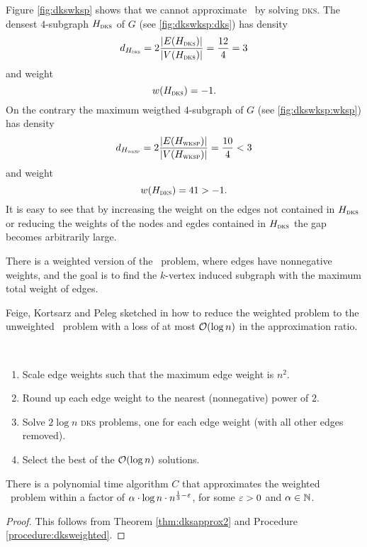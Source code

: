 \begin{example}
	Figure \ref{fig:dkswksp} shows that we cannot approximate \maxWIkSP\ by solving \textsc{dks}. The densest $4$-subgraph $H_{\textsc{dks}}$ of $G$ (see \ref{fig:dkswksp:dks}) has density 
	$$d_{H_{\textsc{dks}}} = 2 \frac{|E(H_{\textsc{dks}})|}{|V(H_{\textsc{dks}})|} = \frac{12}{4} = 3$$
	and weight
	$$w(H_{\textsc{dks}}) = -1.$$
	On the contrary the maximum weigthed $4$-subgraph of $G$ (see \ref{fig:dkswksp:wksp}) has density
	$$d_{H_{\textsc{wksp}}} = 2 \frac{|E(H_{\textsc{wksp}})|}{|V(H_{\textsc{wksp}})|} = \frac{10}{4} < 3$$
	and weight
	$$w(H_{\textsc{dks}}) = 41 > -1.$$
	It is easy to see that by increasing the weight on the edges not contained in $H_{\textsc{dks}}$ or reducing the weights of the nodes and egdes contained in $H_{\textsc{dks}}$ the gap becomes arbitrarily large.
\end{example}

There is a weighted version of the \DkS\ problem, where edges have nonnegative weights, and the goal is to find the $k$-vertex induced subgraph with the maximum total weight of edges.\medskip

Feige, Kortsarz and Peleg sketched in \cite{Feige97} how to reduce the weighted problem to the unweighted \DkS\ problem with a loss of at most $\mathcal{O}(\log n)$ in the approximation ratio. 

\begin{procedure}
	\label{procedure:dksweighted}
	~\begin{enumerate}
		\item Scale edge weights such that the maximum edge weight is $n^2$.
		\item Round up each edge weight to the nearest (nonnegative) power of $2$.
		\item Solve $2 \log n$ \textsc{dks} problems, one for each edge weight (with all other edges removed).
		\item Select the best of the $\mathcal{O}(\log n)$ solutions.
	\end{enumerate}
\end{procedure}

\begin{corollary}
	There is a polynomial time algorithm $C$ that approximates the weighted \DkS\ problem within a factor of $\alpha \cdot \log n \cdot n^{\frac{1}{3} - \varepsilon}$, for some $\varepsilon > 0$ and $\alpha \in \mathbb{N}$.
\end{corollary}
\begin{proof}
	This follows from Theorem \ref{thm:dksapprox2} and Procedure \ref{procedure:dksweighted}.
\end{proof}

